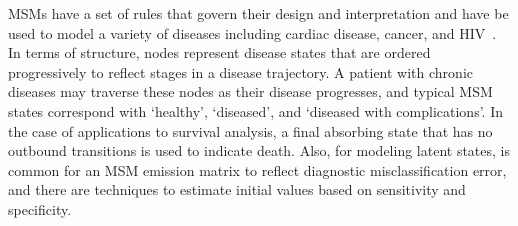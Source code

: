 MSMs have a set of rules that govern their design and interpretation and have be used to model a variety of diseases including cardiac disease, cancer, and HIV~\cite{Jackson10}. In terms of structure, nodes represent disease states that are ordered progressively to reflect stages in a disease trajectory.  A patient with chronic diseases may traverse these nodes as their disease progresses, and typical MSM states correspond with `healthy', `diseased', and `diseased with complications'.  In the case of applications to survival analysis, a final absorbing state that has no outbound transitions is used to indicate death. Also, for modeling latent states, is common for an MSM emission matrix to reflect diagnostic misclassification error, and there are techniques to estimate initial values based on sensitivity and specificity.

